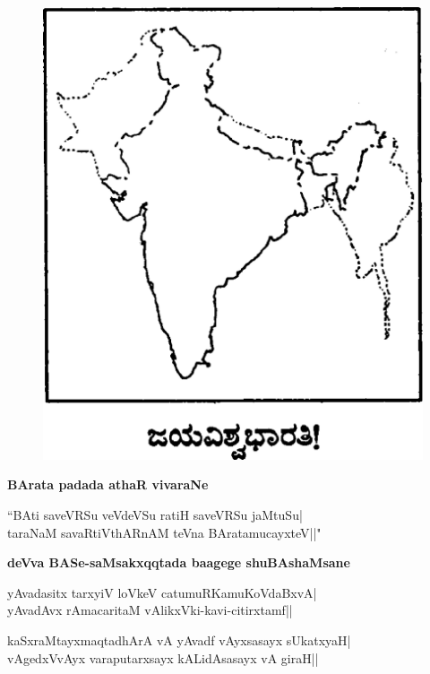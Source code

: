 \begin{figure}[h]
\centering
{\includegraphics[scale=.2]{00191.eps}}
\end{figure}

\noindent
\textbf{BArata padada athaR vivaraNe}\label{page20}

\begin{shloka}
``BAti saveVRSu veVdeVSu ratiH saveVRSu jaMtuSu|\\\label{20}
taraNaM savaRtiVthARnAM teVna BAratamucayxteV||"
\end{shloka}

\noindent
\textbf{deVva BASe-saMsakxqqtada baagege shuBAshaMsane}\label{page20}

\begin{shloka}
yAvadasitx tarxyiV loVkeV catumuRKamuKoVdaBxvA|\\\label{20}
yAvadAvx rAmacaritaM vAlikxVki-kavi-citirxtamf||
\end{shloka}

\begin{shloka}
kaSxraMtayxmaqtadhArA vA yAvadf vAyxsasayx sUkatxyaH|\\
vAgedxVvAyx varaputarxsayx kALidAsasayx vA giraH||
\end{shloka}

